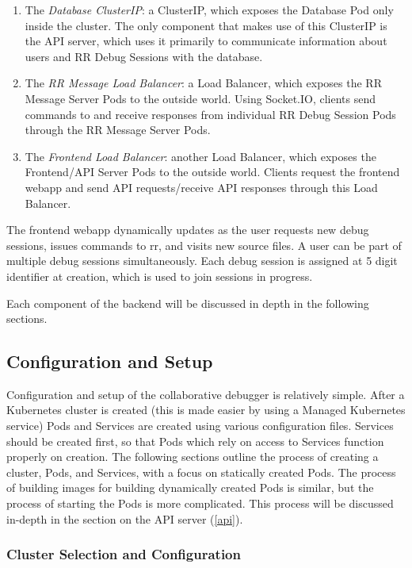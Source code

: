 \documentclass[12pt]{article}
\begin{document}
\begin{enumerate}
\item The \textit{Database ClusterIP}: a ClusterIP, which exposes the
  Database Pod only inside the cluster.  The only component that makes
  use of this ClusterIP is the API server, which uses it primarily to
  communicate information about users and RR Debug Sessions with the
  database.
\item The \textit{RR Message Load Balancer}: a Load Balancer, which
  exposes the RR Message Server Pods to the outside world.  Using
  Socket.IO, clients send commands to and receive responses from
  individual RR Debug Session Pods through the RR Message Server Pods.
\item The \textit{Frontend Load Balancer}: another Load Balancer,
  which exposes the Frontend/API Server Pods to the outside world.
  Clients request the frontend webapp and send API requests/receive
  API responses through this Load Balancer.
\end{enumerate}

The frontend webapp dynamically updates as the user requests new debug
sessions, issues commands to rr, and visits new source files.  A user
can be part of multiple debug sessions simultaneously.  Each debug
session is assigned at 5 digit identifier at creation, which is used
to join sessions in progress.
\par

Each component of the backend will be discussed in depth in the
following sections.

\subsection{Configuration and Setup}

Configuration and setup of the collaborative debugger is relatively
simple.  After a Kubernetes cluster is created (this is made easier by
using a Managed Kubernetes service) Pods and Services are created
using various configuration files.  Services should be created first,
so that Pods which rely on access to Services function properly on
creation.  The following sections outline the process of creating a
cluster, Pods, and Services, with a focus on statically created Pods.
The process of building images for building dynamically created Pods
is similar, but the process of starting the Pods is more complicated.
This process will be discussed in-depth in the section on the API
server (\ref{api}).

\subsubsection{Cluster Selection and Configuration}
\end{document}
